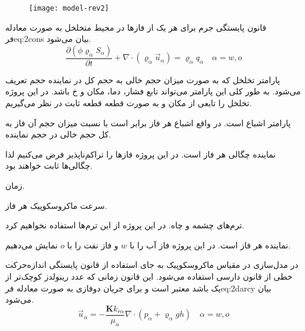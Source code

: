 \begin{figure}[h]
\texttt{[image: model-rev2]}
\label{fig:2rev2}
\end{figure}
قانون پایستگی جرم برای هر یک از فازها در محیط متخلخل به صورت معادله ‌فر{eq:2cons} بیان می‌شود.
\begin{equation}
\label{eq:2cons}
\frac{\partial(\phi \varrho_\alpha S_\alpha)}{\partial t} +
\nabla \cdot (\varrho_\alpha \vec{u}_\alpha) =
\varrho_\alpha q_\alpha 
\quad \alpha=w,o
\end{equation}

\begin{tight_itemize}
\item[$\phi$] 
پارامتر تخلخل که به صورت میزان حجم خالی به حجم کل در نماینده حجم تعریف می‌شود. به طور کلی این پارامتر می‌تواند تابع فشار، دما، مکان و ‌خ{} باشد. در این پروژه تخلخل را تابعی از مکان و به صورت قطعه قطعه ثابت در نظر می‌گیریم.
\item[$S$] 
پارامتر اشباع است. در واقع اشباع هر فاز برابر است با نسبت میزان حجم آن فاز به کل حجم خالی در حجم نماینده.
\item[$\varrho$] 
نماینده چگالی هر فاز است. در این پروژه فاز‌ها را تراکم‌ناپذیر فرض می‌کنیم لذا چگالی‌ها ثابت خواهند بود. 
\item[$t$] 
زمان.
\item[$\vec{u}$] 
سرعت ماکروسکوپیک هر فاز.
\item[$q$] 
ترم‌های چشمه و چاه. در این پروژه از این ترم‌ها استفاده نخواهیم کرد.
\item[$\alpha$] 
نماینده هر فاز است. در این پروژه فاز آب را با $w$ و فاز نفت را با $o$ نمایش می‌دهیم.
\end{tight_itemize}


در مدل‌سازی در مقیاس ماکرو‌سکوپیک به جای استفاده از قانون پایستگی اندازه‌حرکت خطی از قانون دارسی استفاده می‌شود. این قانون زمانی که عدد رینولدز کوچک‌تر از یک باشد معتبر است و برای جریان دو‌فازی به صورت معادله ‌فر{eq:2darcy} بیان می‌شود.
\begin{equation}
\label{eq:2darcy}
\vec{u}_\alpha = 
-\frac{\textbf{K}k_{r\alpha}}{\mu_\alpha}
\nabla \cdot (p_\alpha+\varrho_\alpha  g h) \quad \alpha = w,o 
\end{equation}


